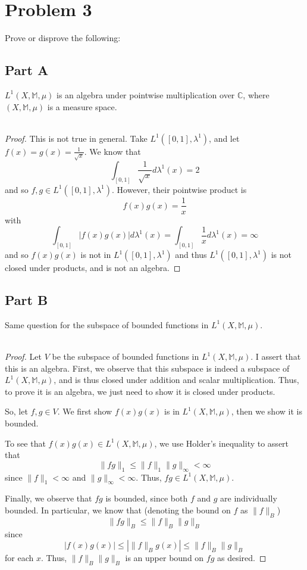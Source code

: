 \documentclass[fontsize=11pt]{scrartcl} %
\numberwithin{equation}{section} %
\numberwithin{figure}{section} %
\numberwithin{table}{section} %
\newcommand{\C}{\mathbb{C}}
\begin{document}
\section*{Problem 3}
Prove or disprove the following:
\subsection*{Part A}
$L^1(X,\mathbb{M},\mu)$ is an algebra under pointwise multiplication over $\C$,
where $(X,\mathbb{M},\mu)$ is a measure space.
\\
\\
\begin{proof}
    This is not true in general. Take $L^1([0,1],\lambda^1)$, and let $f(x) =
    g(x) = \frac{1}{\sqrt{x}}$. We know that
    \[
        \int_{[0,1]}\frac{1}{\sqrt{x}}d\lambda^1(x) = 2
    \]
    and so $f,g\in L^1([0,1],\lambda^1)$. However, their pointwise product is
    \[
        f(x)g(x) = \frac{1}{x}
    \]
    with
    \[
        \int_{[0,1]}|f(x)g(x)|d\lambda^1(x) =
        \int_{[0,1]}\frac{1}{x}d\lambda^1(x) = \infty
    \]
    and so $f(x)g(x)$ is not in $L^1([0,1],\lambda^1)$ and thus
    $L^1([0,1],\lambda^1)$ is not closed under products, and is not an algebra.
\end{proof}

\subsection*{Part B}
Same question for the subspace of bounded functions in $L^1(X,\mathbb{M},\mu)$.
\\
\\
\begin{proof}
    Let $V$ be the subspace of bounded functions in $L^1(X,\mathbb{M},\mu)$. I
    assert that this is an algebra. First, we observe that this subspace is
    indeed a subspace of $L^1(X,\mathbb{M},\mu)$, and is thus closed under
    addition and scalar multiplication. Thus, to prove it is an algebra, we just
    need to show it is closed under products.

    So, let $f,g\in V$. We first show $f(x)g(x)$ is in $L^1(X,\mathbb{M},\mu)$,
    then we show it is bounded.

    To see that $f(x)g(x)\in L^1(X,\mathbb{M},\mu)$, we use Holder's inequality
    to assert that
    \[
        \|fg\|_1 \leq \|f\|_1\|g\|_{\infty} < \infty
    \]
    since $\|f\|_1<\infty$ and $\|g\|_{\infty}<\infty$. Thus, $fg\in
    L^1(X,\mathbb{M},\mu)$.

    Finally, we observe that $fg$ is bounded, since both $f$ and $g$ are
    individually bounded. In particular, we know that (denoting the bound on $f$
    as $\|f\|_B$)
    \[
        \|fg\|_B \leq \|f\|_B\|g\|_B
    \]
    since
    \[
        |f(x)g(x)| \leq |\|f\|_Bg(x)|\leq \|f\|_B\|g\|_B
    \]
    for each $x$. Thus, $\|f\|_B\|g\|_B$ is an upper bound on $fg$ as desired.
\end{proof}
\end{document}
